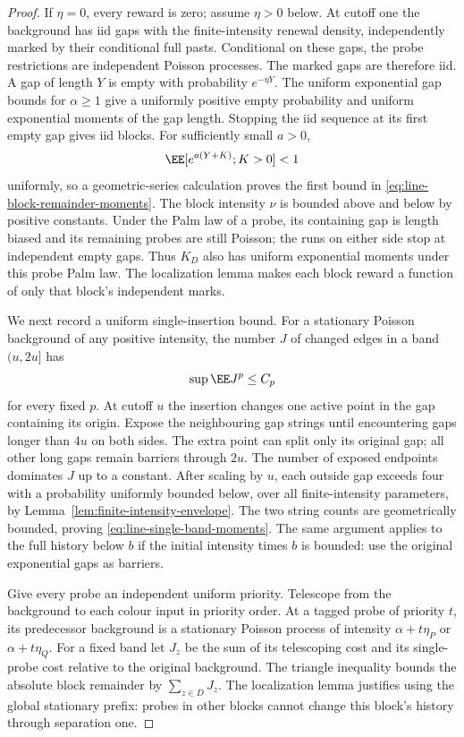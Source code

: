 \documentclass[11pt,letterpaper]{article}
\begin{document}
\begin{proof}
If $\eta=0$, every reward is zero; assume $\eta>0$ below.
At cutoff one the background has iid gaps with the
finite-intensity renewal density, independently marked by
their conditional full pasts. Conditional on these gaps, the
probe restrictions are independent Poisson processes. The
marked gaps are therefore iid. A gap of length $Y$ is empty
with probability $e^{-\eta Y}$. The uniform exponential gap
bounds for $\alpha\ge1$ give a uniformly positive empty
probability and uniform exponential moments of the gap length.
Stopping the iid sequence at its first empty gap gives iid
blocks. For sufficiently small $a>0$,
\[
 \EE[e^{a(Y+K)};K>0]<1
\]
uniformly, so a geometric-series calculation proves the first
bound in \eqref{eq:line-block-remainder-moments}. The block
intensity $\nu$ is bounded above and below by positive constants.
Under the Palm law of a probe, its containing gap is length
biased and its remaining probes are still Poisson; the runs
on either side stop at independent empty gaps. Thus $K_D$
also has uniform exponential moments under this probe Palm law.
The localization lemma makes each block reward a function of
only that block's independent marks.

We next record a uniform single-insertion bound. For a
stationary Poisson background of any positive intensity,
the number $J$ of changed edges in a band $(u,2u]$ has
\begin{equation}\label{eq:line-single-band-moments}
 \sup \EE J^p\le C_p
\end{equation}
for every fixed $p$. At cutoff $u$ the insertion changes one
active point in the gap containing its origin. Expose the
neighbouring gap strings until encountering gaps longer than
$4u$ on both sides. The extra point can split only its original
gap; all other long gaps remain barriers through $2u$.
The number of exposed endpoints dominates $J$ up to a constant.
After scaling by $u$, each outside gap exceeds four with a
probability uniformly bounded below, over all finite-intensity
parameters, by Lemma~\ref{lem:finite-intensity-envelope}.
The two string counts are geometrically bounded, proving
\eqref{eq:line-single-band-moments}. The same argument applies
to the full history below $b$ if the initial intensity times
$b$ is bounded: use the original exponential gaps as barriers.

Give every probe an independent uniform priority. Telescope
from the background to each colour input in priority order.
At a tagged probe of priority $t$, its predecessor background
is a stationary Poisson process of intensity
$\alpha+t\eta_P$ or $\alpha+t\eta_Q$. For a fixed band let
$J_z$ be the sum of its telescoping cost and its single-probe
cost relative to the original background. The triangle inequality
bounds the absolute block remainder by $\sum_{z\in D}J_z$.
The localization lemma justifies using the global stationary
prefix: probes in other blocks cannot change this block's
history through separation one.


\end{proof}
\end{document}
